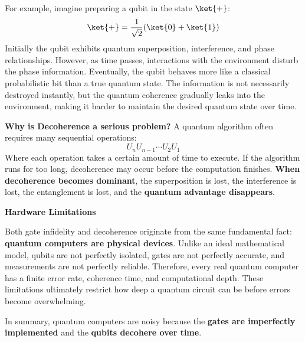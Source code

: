 \begin{itemize}
    For example, imagine preparing a qubit in the state $\ket{+}$:
    \begin{equation*}
        \ket{+} = \frac{1}{\sqrt{2}}(\ket{0} + \ket{1})
    \end{equation*}
    Initially the qubit exhibits quantum superposition, interference, and phase relationships. However, as time passes, interactions with the environment disturb the phase information. Eventually, the qubit behaves more like a classical probabilistic bit than a true quantum state. The information is not necessarily destroyed instantly, but the quantum coherence gradually leaks into the environment, making it harder to maintain the desired quantum state over time.

    \highspace
    \textcolor{Red2}{ \textbf{Why is Decoherence a serious problem?}} A quantum algorithm often requires many sequential operations:
    \begin{equation*}
        U_n U_{n-1} \cdots U_2 U_1
    \end{equation*}
    Where each operation takes a certain amount of time to execute. If the algorithm runs for too long, decoherence may occur before the computation finishes. \textbf{When decoherence becomes dominant}, the superposition is lost, the interference is lost, the entanglement is lost, and the \textbf{quantum advantage disappears}.
\end{itemize}

\highspace
\begin{flushleft}
    \textcolor{Red2}{ \textbf{Hardware Limitations}}
\end{flushleft}
Both gate infidelity and decoherence originate from the same fundamental fact: \textbf{quantum computers are physical devices}. Unlike an ideal mathematical model, qubits are not perfectly isolated, gates are not perfectly accurate, and measurements are not perfectly reliable. Therefore, every real quantum computer has a finite error rate, coherence time, and computational depth. These limitations ultimately restrict how deep a quantum circuit can be before errors become overwhelming.

\highspace
In summary, quantum computers are noisy because the \textbf{gates are imperfectly implemented} and the \textbf{qubits decohere over time}.